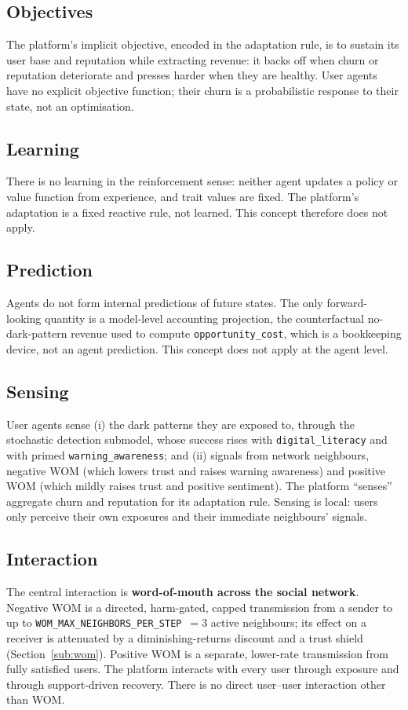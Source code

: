 \documentclass[11pt]{article}
\newcommand{\code}[1]{\texttt{#1}}
\begin{document}
\subsection{Objectives}
The platform's implicit objective, encoded in the adaptation rule, is to sustain
its user base and reputation while extracting revenue: it backs off when churn or
reputation deteriorate and presses harder when they are healthy. User agents have
no explicit objective function; their churn is a probabilistic response to their
state, not an optimisation.

\subsection{Learning}
There is no learning in the reinforcement sense: neither agent updates a policy or
value function from experience, and trait values are fixed. The platform's
adaptation is a fixed reactive rule, not learned. This concept therefore does not
apply.

\subsection{Prediction}
Agents do not form internal predictions of future states. The only forward-looking
quantity is a model-level accounting projection, the counterfactual
no-dark-pattern revenue used to compute \code{opportunity\_cost}, which is a
bookkeeping device, not an agent prediction. This concept does not apply at the
agent level.

\subsection{Sensing}
User agents sense (i) the dark patterns they are exposed to, through the
stochastic detection submodel, whose success rises with \code{digital\_literacy}
and with primed \code{warning\_awareness}; and (ii) signals from network
neighbours, negative WOM (which lowers trust and raises warning awareness) and
positive WOM (which mildly raises trust and positive sentiment). The platform
``senses'' aggregate churn and reputation for its adaptation rule. Sensing is
local: users only perceive their own exposures and their immediate neighbours'
signals.

\subsection{Interaction}
The central interaction is \textbf{word-of-mouth across the social network}.
Negative WOM is a directed, harm-gated, capped transmission from a sender to up
to \code{WOM\_MAX\_NEIGHBORS\_PER\_STEP}~$=3$ active neighbours; its effect on a
receiver is attenuated by a diminishing-returns discount and a trust shield
(Section~\ref{sub:wom}). Positive WOM is a separate, lower-rate transmission from
fully satisfied users. The platform interacts with every user through exposure
and through support-driven recovery. There is no direct user--user interaction
other than WOM.
\end{document}
